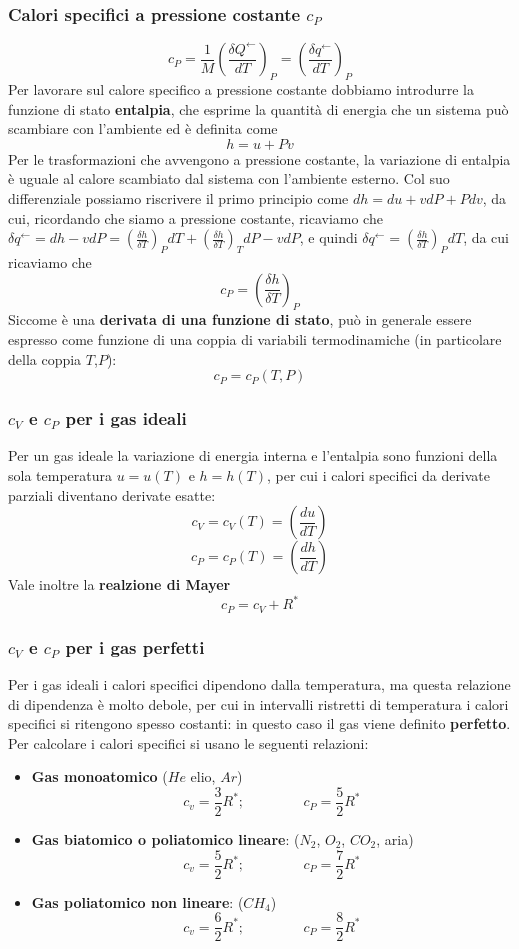 \subsubsection{Calori specifici a pressione costante $c_P$}
\[
    c_P =\frac{1}{M}\left(\frac{\delta Q^\leftarrow }{dT}\right)_P = \left(\frac{\delta q^\leftarrow }{dT}\right)_P
\]
Per lavorare sul calore specifico a pressione costante dobbiamo introdurre la funzione di stato \textbf{entalpia}, che esprime la quantità di energia che un sistema può scambiare con l'ambiente ed è definita come
\[
    h = u + Pv
\]
Per le trasformazioni che avvengono a pressione costante, la variazione di entalpia è uguale al calore scambiato dal sistema con l'ambiente esterno. Col suo differenziale possiamo riscrivere il primo principio come $dh = du + vdP + Pdv$, da cui, ricordando che siamo a pressione costante, ricaviamo che $\delta q^\leftarrow = dh - vdP = \left(\frac{\delta h}{\delta T}\right)_P dT + \left(\frac{\delta h}{\delta T}\right)_T dP - vdP$, e quindi $\delta q^\leftarrow  =  \left(\frac{\delta h}{\delta T}\right)_P dT$, da cui ricaviamo che
\[
    c_P =  \left(\frac{\delta h}{\delta T}\right)_P
\]
Siccome è una \textbf{derivata di una funzione di stato}, può in generale essere espresso come funzione di una coppia di variabili termodinamiche (in particolare della coppia $T$,$P$): 
\[
    c_P = c_P(T,P)
\]
\subsubsection{$c_V$ e $c_P$ per i gas ideali}
Per un gas ideale la variazione di energia interna e l'entalpia sono funzioni della sola temperatura $u = u(T)$ e $h = h(T)$, per cui i calori specifici da derivate parziali diventano derivate esatte:
\[
    c_V = c_V(T) = \left(\frac{d u}{d T}\right)
\]
\[
    c_P = c_P(T) = \left( \frac{d h}{ d T}\right)
\]
Vale inoltre la \textbf{realzione di Mayer}
\[
    c_P = c_V + R^*
\]
\subsubsection{$c_V$ e $c_P$ per i gas perfetti}
Per i gas ideali i calori specifici dipendono dalla temperatura, ma questa relazione di dipendenza è molto debole, per cui in intervalli ristretti di temperatura i calori specifici si ritengono spesso costanti: in questo caso il gas viene definito \textbf{perfetto}.\newline
\newline
Per calcolare i calori specifici si usano le seguenti relazioni:
\begin{itemize}
    \item \textbf{Gas monoatomico} ($He$ elio, $Ar$)
    \[
        c_v = \frac{3}{2}R^*; \;\;\;\;\;\;\;\;\;\;\;\;\;\;\;c_P = \frac{5}{2}R^*
    \]
    \item \textbf{Gas biatomico o poliatomico lineare}: ($N_2$, $O_2$, $CO_2$, aria)
    \[
        c_v = \frac{5}{2}R^*; \;\;\;\;\;\;\;\;\;\;\;\;\;\;\;c_P = \frac{7}{2}R^*
    \]
    \item \textbf{Gas poliatomico non lineare}: ($CH_4$)
    \[
        c_v = \frac{6}{2}R^*; \;\;\;\;\;\;\;\;\;\;\;\;\;\;\;c_P = \frac{8}{2}R^*
    \]
\end{itemize}
